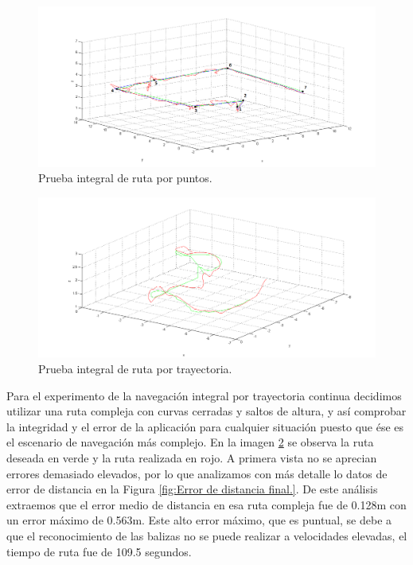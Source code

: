 \begin{figure}[H]
	\begin{center}
		\includegraphics[width=1.1\textwidth]{imag/IMG42.png}
				\caption{Prueba integral de ruta por puntos.}
		\label{fig:Prueba integral de ruta por puntos.}	
	\end{center}
\end{figure}

\begin{figure}[H]
	\begin{center}
		\includegraphics[width=1.1\textwidth]{imag/IMG43.png}
				\caption{Prueba integral de ruta por trayectoria.}
		\label{fig:Prueba integral de ruta por trayectoria.}	
	\end{center}
\end{figure}

\hspace{1cm} Para el experimento de la navegación integral por trayectoria continua decidimos utilizar una ruta compleja con curvas cerradas y saltos de altura, y así comprobar la integridad y el error de la aplicación para cualquier situación puesto que ése es el escenario de navegación más complejo. En la imagen \ref{fig:Prueba integral de ruta por trayectoria.} se observa la ruta deseada en verde y la ruta realizada en rojo. A primera vista no se aprecian errores demasiado elevados, por lo que analizamos con más detalle lo datos de error de distancia en la Figura \ref{fig:Error de distancia final.}. De este análisis extraemos que el error medio de distancia en esa ruta compleja fue de 0.128m con un error máximo de 0.563m. Este alto error máximo, que es puntual, se debe a que el reconocimiento de las balizas no se puede realizar a velocidades elevadas, el tiempo de ruta fue de 109.5 segundos.

